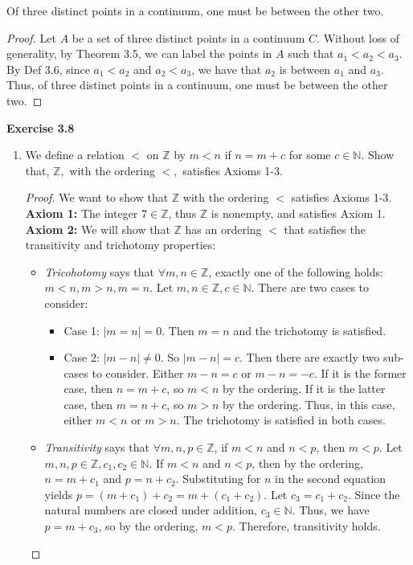 \documentclass[11pt]{article}
\begin{document}
\begin{corollary}[3.7]
 Of three distinct points in a continuum, one must be between the other two.
\end{corollary}
\begin{proof}
Let $A$ be a set of three distinct points in a continuum $C$. Without loss of generality, by Theorem 3.5, we can label the points in $A$ such that $a_1 < a_2 < a_3$. By Def 3.6, since $a_1 < a_2$ and $a_2 < a_3$, we have that $a_2$ is between $a_1$ and $a_3$. Thus, of three distinct points in a continuum, one must be between the other two.
\end{proof}
\textbf{Exercise 3.8}
\begin{enumerate}

\item[a)]We define a relation $<$ on $\mathbb{Z}$ by $m<n$ if $n=m+c$ for some $c\in \mathbb{N}.$  Show that,
$\mathbb{Z},$ with the ordering $<,$ satisfies Axioms 1-3. 
\begin{proof}
We want to show that $\mathbb{Z}$ with the ordering $<$ satisfies Axioms 1-3. \\ 
\textbf{Axiom 1:} The integer $7 \in \mathbb{Z}$, thus $\mathbb{Z}$ is nonempty, and satisfies Axiom 1.\\
\textbf{Axiom 2:} We will show that $\mathbb{Z}$ has an ordering $<$ that satisfies the transitivity and trichotomy properties:
    \begin{itemize}
        \item\textit{Tricohotomy} says that $\forall m, n \in \mathbb{Z}$, exactly one of the following holds: $m<n, m>n, m=n$. Let $m, n \in \mathbb{Z}, c \in \mathbb{N}$. There are two cases to consider:
        \begin{itemize}
            \item Case 1: $|m=n| = 0$. Then $m=n$ and the trichotomy is satisfied.
            \item Case 2: $|m-n| \neq 0$. So $|m-n| = c$. Then there are exactly two sub-cases to consider. Either $m-n = c$ or $m-n = -c$. If it is the former case, then $n = m + c$, so $m < n$ by the ordering. If it is the latter case, then $m = n + c$, so $m > n$ by the ordering. Thus, in this case, either $m < n$ or $m > n$. 
            The trichotomy is satisfied in both cases.
        \end{itemize}
        \item\textit{Transitivity} says that $\forall m, n, p \in \mathbb{Z}$, if $m < n$ and $n < p$, then $m < p$. Let $m, n, p \in \mathbb{Z}, c_1, c_2 \in \mathbb{N}$. If $m < n$ and $n < p$, then by the ordering, $n = m + c_1$ and $p = n + c_2$. Substituting for $n$ in the second equation yields $p = (m + c_1) + c_2 = m + (c_1 + c_2)$. Let $c_3 = c_1 + c_2$. Since the natural numbers are closed under addition, $c_3 \in \mathbb{N}$. Thus, we have $p = m + c_3$, so by the ordering, $m < p$. Therefore, transitivity holds. 

\end{itemize}
\end{proof}
\end{enumerate}
\end{document}
